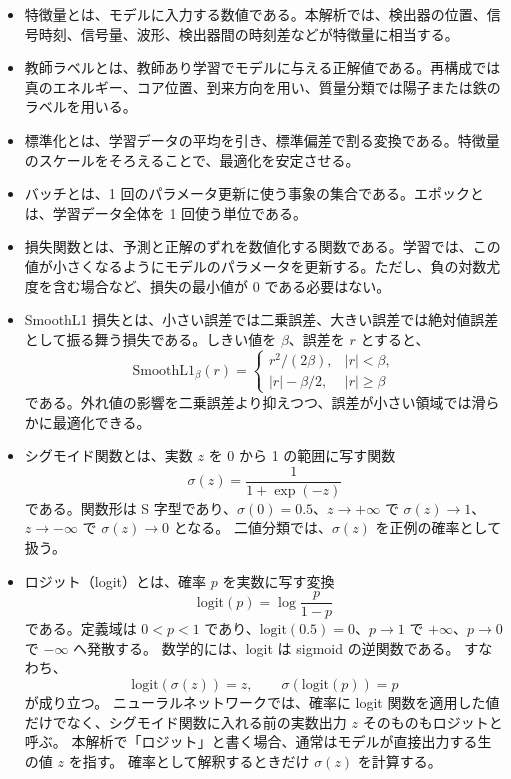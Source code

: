 \documentclass[lualatex,paper=a4,fontsize=9pt]{jlreq}
\begin{document}
\begin{itemize}
  \item 特徴量とは、モデルに入力する数値である。本解析では、検出器の位置、信号時刻、信号量、波形、検出器間の時刻差などが特徴量に相当する。
  \item 教師ラベルとは、教師あり学習でモデルに与える正解値である。再構成では真のエネルギー、コア位置、到来方向を用い、質量分類では陽子または鉄のラベルを用いる。
  \item 標準化とは、学習データの平均を引き、標準偏差で割る変換である。特徴量のスケールをそろえることで、最適化を安定させる。
  \item バッチとは、1 回のパラメータ更新に使う事象の集合である。エポックとは、学習データ全体を 1 回使う単位である。
  \item 損失関数とは、予測と正解のずれを数値化する関数である。学習では、この値が小さくなるようにモデルのパラメータを更新する。ただし、負の対数尤度を含む場合など、損失の最小値が 0 である必要はない。
  \item SmoothL1 損失とは、小さい誤差では二乗誤差、大きい誤差では絶対値誤差として振る舞う損失である。しきい値を $\beta$、誤差を $r$ とすると、
  \[
    \mathrm{SmoothL1}_{\beta}(r)=
    \begin{cases}
      r^2/(2\beta), & |r|<\beta,\\
      |r|-\beta/2, & |r|\ge\beta
    \end{cases}
  \]
  である。外れ値の影響を二乗誤差より抑えつつ、誤差が小さい領域では滑らかに最適化できる。
  \item シグモイド関数とは、実数 $z$ を 0 から 1 の範囲に写す関数
  \[
    \sigma(z)=\frac{1}{1+\exp(-z)}
  \]
  である。関数形は S 字型であり、$\sigma(0)=0.5$、$z\rightarrow+\infty$ で $\sigma(z)\rightarrow1$、$z\rightarrow-\infty$ で $\sigma(z)\rightarrow0$ となる。
  二値分類では、$\sigma(z)$ を正例の確率として扱う。
  \item ロジット（logit）とは、確率 $p$ を実数に写す変換
  \[
    \mathrm{logit}(p)=\log\frac{p}{1-p}
  \]
  である。定義域は $0<p<1$ であり、$\mathrm{logit}(0.5)=0$、$p\rightarrow1$ で $+\infty$、$p\rightarrow0$ で $-\infty$ へ発散する。
  数学的には、logit は sigmoid の逆関数である。
  すなわち、
  \[
    \mathrm{logit}(\sigma(z))=z,\qquad
    \sigma(\mathrm{logit}(p))=p
  \]
  が成り立つ。
  ニューラルネットワークでは、確率に logit 関数を適用した値だけでなく、シグモイド関数に入れる前の実数出力 $z$ そのものもロジットと呼ぶ。
  本解析で「ロジット」と書く場合、通常はモデルが直接出力する生の値 $z$ を指す。
  確率として解釈するときだけ $\sigma(z)$ を計算する。

\end{itemize}
\end{document}
